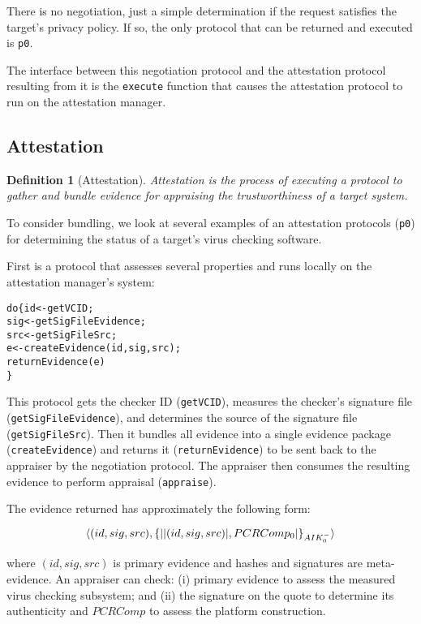 \documentclass[10pt]{article}
\newtheorem{definition}{Definition}
\begin{document}
There is no negotiation, just a simple determination if the request
satisfies the target's privacy policy.  If so, the only protocol that
can be returned and executed is \Verb+p0+.

The interface between this negotiation protocol and the attestation
protocol resulting from it is the \Verb+execute+ function that causes
the attestation protocol to run on the attestation manager.

\subsection*{Attestation}

\begin{definition}[Attestation]
  Attestation is the process of executing a protocol to gather and
  bundle evidence for appraising the trustworthiness of a target
  system.
\end{definition}

To consider bundling, we look at several examples of an attestation
protocols (\Verb+p0+) for determining the status of a target's virus
checking software.

First is a protocol that assesses several properties and runs locally
on the attestation manager's system:

\begin{alltt}
  do \{ id <- getVCID;
       sig <- getSigFileEvidence;
       src <- getSigFileSrc;
       e <- createEvidence(id,sig,src);
       returnEvidence(e)
  \}
\end{alltt}

This protocol gets the checker ID (\Verb+getVCID+), measures the
checker's signature file (\Verb+getSigFileEvidence+), and determines
the source of the signature file (\Verb+getSigFileSrc+). Then it
bundles all evidence into a single evidence package
(\Verb+createEvidence+) and returns it (\Verb+returnEvidence+) to be
sent back to the appraiser by the negotiation protocol.  The appraiser
then consumes the resulting evidence to perform appraisal
(\Verb+appraise+).

The evidence returned has approximately the following form:

\[\langle (id,sig,src),\{\lvert \lvert (id,sig,src) \rvert,PCRComp_0\rvert\}_{AIK_0^{-}}\rangle\]

where $(id,sig,src)$ is primary evidence and hashes and signatures are
meta-evidence.  An appraiser can check: (i) primary evidence to assess
the measured virus checking subsystem; and (ii) the signature on the
quote to determine its authenticity and $PCRComp$ to assess the
platform construction.
\end{document}
